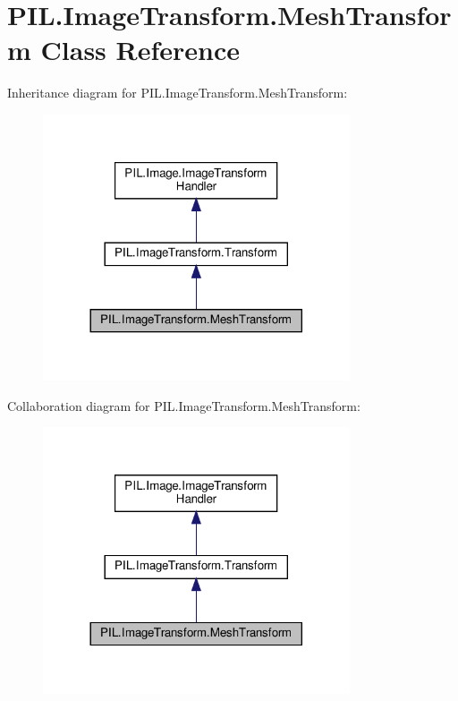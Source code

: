 \hypertarget{classPIL_1_1ImageTransform_1_1MeshTransform}{}\section{P\+I\+L.\+Image\+Transform.\+Mesh\+Transform Class Reference}
\label{classPIL_1_1ImageTransform_1_1MeshTransform}


Inheritance diagram for P\+I\+L.\+Image\+Transform.\+Mesh\+Transform\+:
\nopagebreak
\begin{figure}[H]
\begin{center}
\leavevmode
\includegraphics[width=257pt]{classPIL_1_1ImageTransform_1_1MeshTransform__inherit__graph}
\end{center}
\end{figure}


Collaboration diagram for P\+I\+L.\+Image\+Transform.\+Mesh\+Transform\+:
\nopagebreak
\begin{figure}[H]
\begin{center}
\leavevmode
\includegraphics[width=257pt]{classPIL_1_1ImageTransform_1_1MeshTransform__coll__graph}
\end{center}
\end{figure}
